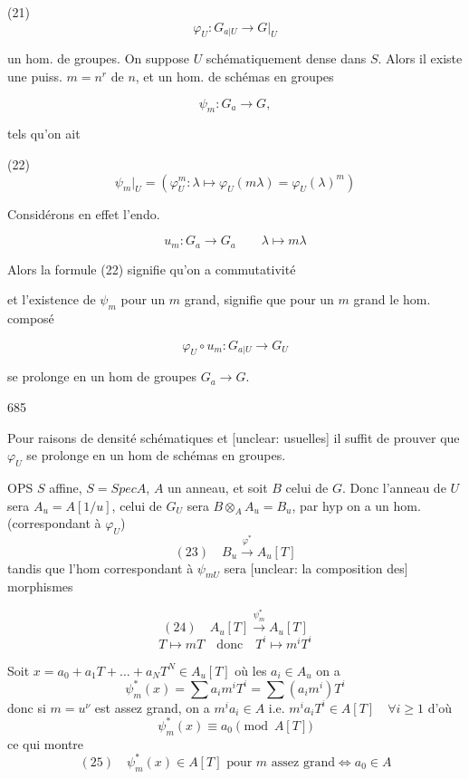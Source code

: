 (21) $$ \varphi_U : G_{a|U} \to G|_U $$

un hom. de groupes. On suppose $U$ schématiquement dense dans $S$. Alors il existe une puiss. $m = n^r$ de $n$, et un hom. de schémas en groupes

$$ \psi_m : G_a \to G , $$

tels qu'on ait

(22) $$ \psi_m|_U = (\varphi_U^m : \lambda \mapsto \varphi_U(m\lambda) = \varphi_U(\lambda)^m) $$

Considérons en effet l'endo.

$$ u_m : G_a \to G_a \qquad \lambda \mapsto m\lambda $$

Alors la formule (22) signifie qu'on a commutativité


et l'existence de $\psi_m$ pour un $m$ grand, signifie que pour un $m$ grand le hom. composé

$$ \varphi_U \circ u_m : G_{a|U} \to G_U $$

se prolonge en un hom de groupes $G_a \to G$.

\newpage


685

Pour raisons de densité schématiques et [unclear: usuelles]
il suffit de prouver que $\varphi_U$ se prolonge en un
hom de schémas en groupes.

OPS $S$ affine, $S = Spec A$, $A$ un anneau, et soit
$B$ celui de $G$. Donc l'anneau de $U$ sera
$A_u = A[1/u]$, celui de $G_U$ sera
$B \otimes_A A_u = B_u$, par hyp on a un hom.
(correspondant à $\varphi_U$)
$$ (23) \quad B_u \xrightarrow{\varphi^*} A_u[T] $$
tandis que l'hom correspondant à
$\psi_{mU}$ sera [unclear: la composition des] morphismes

$$ (24) \quad A_u[T] \xrightarrow{\psi_m^*} A_u[T] $$
$$ T \mapsto mT \quad \text{donc} \quad T^i \mapsto m^i T^i $$

Soit $x = a_0 + a_1 T + \dots + a_N T^N \in A_u[T]$ où les $a_i \in A_u$
on a
$$ \psi_m^*(x) = \sum a_i m^i T^i = \sum (a_i m^i) T^i $$
donc si $m = u^\nu$ est assez grand, on a
$m^i a_i \in A$ i.e. $m^i a_i T^i \in A[T] \quad \forall i \ge 1$
d'où
$$ \psi_m^*(x) \equiv a_0 \pmod{A[T]} $$
ce qui montre
$$ (25) \quad \psi_m^*(x) \in A[T] \text{ pour } m \text{ assez grand} \iff a_0 \in A $$


